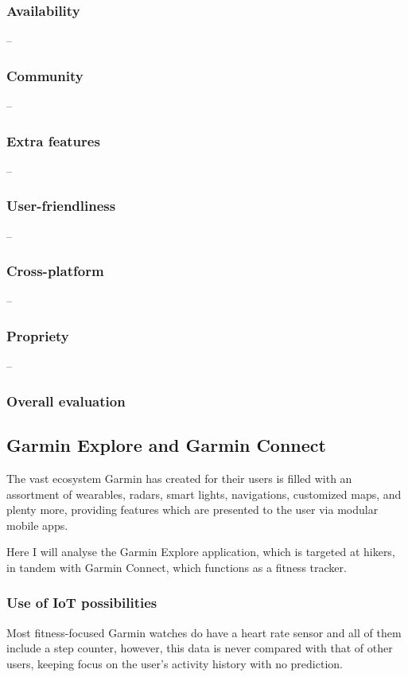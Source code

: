 \subsubsection*{Availability} --
\subsubsection*{Community} -- 
\subsubsection*{Extra features} -- 
\subsubsection*{User-friendliness} -- 
\subsubsection*{Cross-platform} -- 
\subsubsection*{Propriety} -- 
\subsubsection*{Overall evaluation}

\subsection{Garmin Explore and Garmin Connect}
The vast ecosystem Garmin has created for their users is filled with an assortment of wearables, radars, smart lights, navigations, customized maps, and plenty more, providing features which are presented to the user via modular mobile apps.

Here I will analyse the Garmin Explore application, which is targeted at hikers, in tandem with Garmin Connect, which functions as a fitness tracker.

\subsubsection*{Use of IoT possibilities}
Most fitness-focused Garmin watches do have a heart rate sensor and all of them include a step counter, however, this data is never compared with that of other users, keeping focus on the user's activity history with no prediction.
